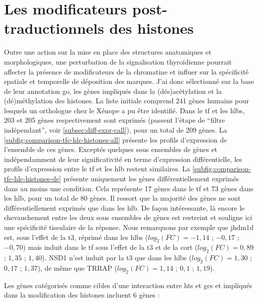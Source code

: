 \documentclass[../main.tex]{subfiles}
\begin{document}
	


\section{Les modificateurs post-traductionnels des histones}\label{sec:res-histones}

	Outre une action sur la mise en place des structures anatomiques et morphologiques, une perturbation de la signalisation thyroïdienne pourrait affecter la présence de modificateurs de la chromatine et influer sur la spécificité spatiale et temporelle de déposition des marques.
	J'ai donc sélectionné sur la base de leur annotation \gls{go}, les gènes impliqués dans la (dés)acétylation et la (dé)méthylation des histones.
	La liste initiale comprend 241 gènes humains pour lesquels un orthologue chez le Xénope a pu être identifié.
	Dans le \gls{tf} et les \glspl{hlb}, 203 et 205 gènes respectivement sont exprimés (passent l'étape de ``filtre indépendant'', voir \autoref{subsec:diff-expr-call}), pour un total de 209 gènes.
	La \autoref{subfig:comparison-tfc-hlc-histones-all} présente les profils d'expression de l'ensemble de ces gènes.
	Exceptés quelques sous ensembles de gènes et indépendamment de leur significativité en terme d'expression différentielle, les profils d'expression entre le \gls{tf} et les \gls{hlb} restent similaires.
	La \autoref{subfig:comparison-tfc-hlc-histones-de} présente uniquement les gènes différentiellement exprimés dans au moins une condition.
	Cela représente 17 gènes dans le \gls{tf} et 73 gènes dans les \gls{hlb}, pour un total de 80 gènes.
	Il ressort que la majorité des gènes ne sont différentiellement exprimés que dans les \gls{hlb}.
	De façon intéressante, là encore le chevauchement entre les deux sous ensembles de gènes est restreint et souligne ici une spécificité tissulaire de la réponse.
	Nous remarquons par exemple que \gls{jhdm1d} est, sous l'effet de la \gls{t3}, réprimé dans les \glspl{hlb} ($log_2(FC)=-1,14$ ; $-0,17$ ; $-0,70$) mais induit dans le \gls{tf} sous l'effet de la \gls{t3} et de la \gls{cort} ($log_2(FC)=0,89$ ; $1,35$ ; $1,40$).
	NSD1 n'est induit par la \gls{t3} que dans les \glspl{hlb} ($log_2(FC)=1,30$ ; $0,17$ ; $1,37$), de même que TRRAP ($log_2(FC)=1,14$ ; $0,1$ ; $1,19$).
	\par
	Les gènes catégorisés comme cibles d'une interaction entre \glspl{ht} et \glspl{gc} et impliqués dans la modification des histones incluent 6 gènes :
\end{document}
